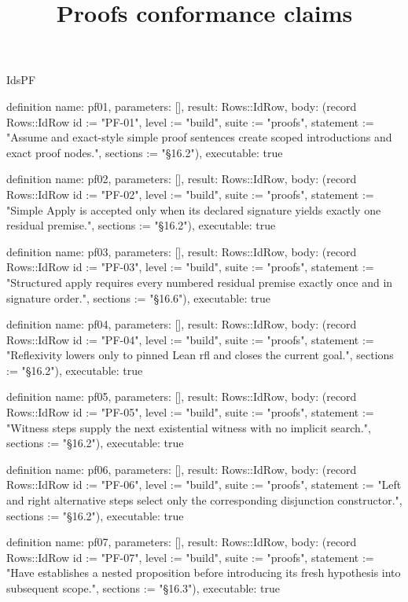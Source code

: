 \begin{lexlean}{IdsPF}
\title{Proofs conformance claims}
\begin{semanticmodule}
definition{
  name: pf01,
  parameters: [],
  result: Rows::IdRow,
  body: (record Rows::IdRow {id := "PF-01", level := "build", suite := "proofs", statement := "Assume and exact-style simple proof sentences create scoped introductions and exact proof nodes.", sections := "§16.2"}),
  executable: true
}

definition{
  name: pf02,
  parameters: [],
  result: Rows::IdRow,
  body: (record Rows::IdRow {id := "PF-02", level := "build", suite := "proofs", statement := "Simple Apply is accepted only when its declared signature yields exactly one residual premise.", sections := "§16.2"}),
  executable: true
}

definition{
  name: pf03,
  parameters: [],
  result: Rows::IdRow,
  body: (record Rows::IdRow {id := "PF-03", level := "build", suite := "proofs", statement := "Structured apply requires every numbered residual premise exactly once and in signature order.", sections := "§16.6"}),
  executable: true
}

definition{
  name: pf04,
  parameters: [],
  result: Rows::IdRow,
  body: (record Rows::IdRow {id := "PF-04", level := "build", suite := "proofs", statement := "Reflexivity lowers only to pinned Lean rfl and closes the current goal.", sections := "§16.2"}),
  executable: true
}

definition{
  name: pf05,
  parameters: [],
  result: Rows::IdRow,
  body: (record Rows::IdRow {id := "PF-05", level := "build", suite := "proofs", statement := "Witness steps supply the next existential witness with no implicit search.", sections := "§16.2"}),
  executable: true
}

definition{
  name: pf06,
  parameters: [],
  result: Rows::IdRow,
  body: (record Rows::IdRow {id := "PF-06", level := "build", suite := "proofs", statement := "Left and right alternative steps select only the corresponding disjunction constructor.", sections := "§16.2"}),
  executable: true
}

definition{
  name: pf07,
  parameters: [],
  result: Rows::IdRow,
  body: (record Rows::IdRow {id := "PF-07", level := "build", suite := "proofs", statement := "Have establishes a nested proposition before introducing its fresh hypothesis into subsequent scope.", sections := "§16.3"}),
  executable: true
}


\end{semanticmodule}
\end{lexlean}
